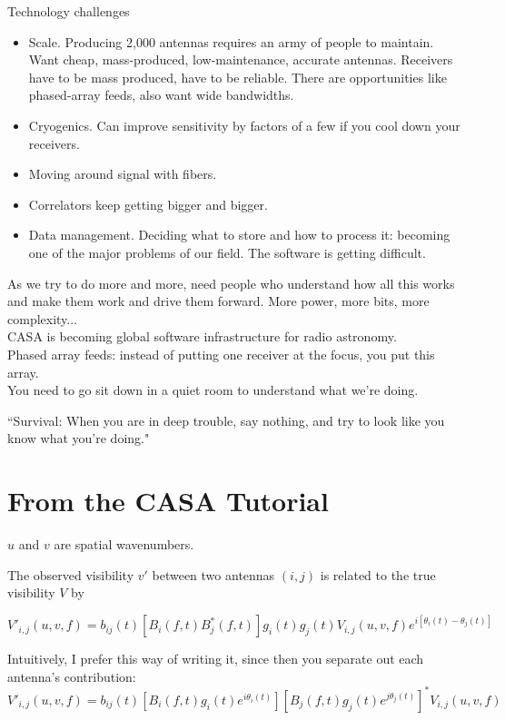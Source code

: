 \documentclass[a4paper]{article}
\begin{document}
Technology challenges

\begin{itemize}
\item Scale. Producing 2,000 antennas requires an army of people to maintain. Want cheap, mass-produced, low-maintenance, accurate antennas. Receivers have to be mass produced, have to be reliable. There are opportunities like phased-array feeds, also want wide bandwidths. 
\item Cryogenics. Can improve sensitivity by factors of a few if you cool down your receivers. 
\item Moving around signal with fibers.
\item Correlators keep getting bigger and bigger. 
\item Data management. Deciding what to store and how to process it: becoming one of the major problems of our field. The software is getting difficult. 
\end{itemize}

As we try to do more and more, need people who understand how all this works and make them work and drive them forward. More power, more bits, more complexity... \\

CASA is becoming global software infrastructure for radio astronomy.  \\

Phased array feeds: instead of putting one receiver at the focus, you put this array. \\

You need to go sit down in a quiet room to understand what we're doing. 

``Survival: When you are in deep trouble, say nothing, and try to look like you know what you're doing."

\section{From the CASA Tutorial}

$u$ and $v$ are spatial wavenumbers. 

The observed visibility $v'$ between two antennas $(i,j)$ is related to the true visibility $V$ by

\begin{equation}
V'_{i,j}(u,v,f) = b_{ij} (t) [B_i(f,t) B_j^*(f,t)] g_i(t) g_j(t) V_{i,j} (u,v,f) e^{i[\theta_i(t)-\theta_j(t)]}
\end{equation}

Intuitively, I prefer this way of writing it, since then you separate out each antenna's contribution:
\begin{equation}
V'_{i,j}(u,v,f) = b_{ij} (t)
[B_i(f,t) g_i(t) e^{i\theta_i(t)}]
[B_j(f,t) g_j(t) e^{j\theta_j(t)}]^*
V_{i,j} (u,v,f)
\end{equation}
\end{document}
